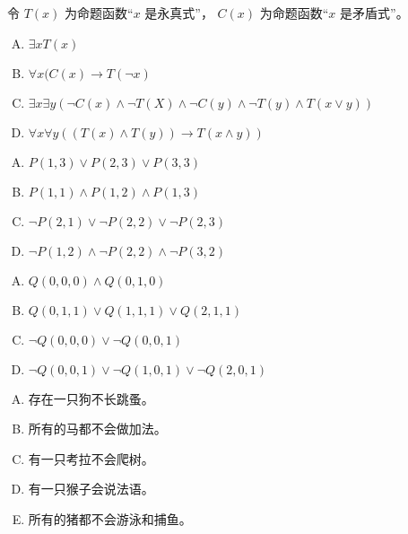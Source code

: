 {{        %
        \begin{practices}
            令 $T(x)$ 为命题函数``$x$ 是永真式''， $C(x)$ 为命题函数``$x$ 是矛盾式''。
            \begin{enumerate}[A.]
                \item $\exists x T(x)$
                \item $\forall x (C(x) \rightarrow T(\neg x)$
                \item $\exists x \exists y (\neg C(x) \wedge \neg T(X) \wedge \neg C(y) \wedge \neg T(y) \wedge T(x \vee y))$
                \item $\forall x \forall y ((T(x) \wedge T(y)) \rightarrow T(x \wedge y))$
            \end{enumerate}
        \end{practices}

        \begin{practices}
            \begin{enumerate}[A.]
                \item $P(1, 3) \vee P(2, 3) \vee P(3, 3)$
                \item $P(1, 1) \wedge P(1, 2) \wedge P(1, 3)$
                \item $\neg P(2, 1) \vee \neg P(2, 2) \vee \neg P(2, 3)$
                \item $\neg P(1, 2) \wedge \neg P(2, 2) \wedge \neg P(3, 2)$
            \end{enumerate}
        \end{practices}

        \begin{practices}
            \begin{enumerate}[A.]
                \item $Q(0, 0, 0) \wedge Q(0, 1, 0)$
                \item $Q(0, 1, 1) \vee Q(1, 1, 1) \vee Q(2, 1, 1)$
                \item $\neg Q(0, 0, 0) \vee \neg Q(0, 0, 1)$
                \item $\neg Q(0, 0, 1) \vee \neg Q(1, 0, 1) \vee \neg Q(2, 0, 1)$
            \end{enumerate}
        \end{practices}

        \begin{practices}
            \begin{enumerate}[A.]
                \item 存在一只狗不长跳蚤。
                \item 所有的马都不会做加法。
                \item 有一只考拉不会爬树。
                \item 有一只猴子会说法语。
                \item 所有的猪都不会游泳和捕鱼。
            \end{enumerate}
        \end{practices}

}}
